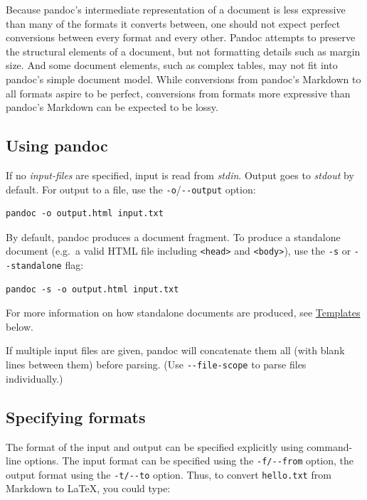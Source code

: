 \documentclass[
]{article}
\begin{document}
Because pandoc's intermediate representation of a document is less
expressive than many of the formats it converts between, one should not
expect perfect conversions between every format and every other. Pandoc
attempts to preserve the structural elements of a document, but not
formatting details such as margin size. And some document elements, such
as complex tables, may not fit into pandoc's simple document model.
While conversions from pandoc's Markdown to all formats aspire to be
perfect, conversions from formats more expressive than pandoc's Markdown
can be expected to be lossy.

\hypertarget{using-pandoc}{%
\subsection{Using pandoc}\label{using-pandoc}}

If no \emph{input-files} are specified, input is read from \emph{stdin}.
Output goes to \emph{stdout} by default. For output to a file, use the
\texttt{-o}/\texttt{-\/-output} option:

\begin{verbatim}
pandoc -o output.html input.txt
\end{verbatim}

By default, pandoc produces a document fragment. To produce a standalone
document (e.g.~a valid HTML file including
\texttt{\textless{}head\textgreater{}} and
\texttt{\textless{}body\textgreater{}}), use the \texttt{-s} or
\texttt{-\/-standalone} flag:

\begin{verbatim}
pandoc -s -o output.html input.txt
\end{verbatim}

For more information on how standalone documents are produced, see
\protect\hyperlink{templates}{Templates} below.

If multiple input files are given, pandoc will concatenate them all
(with blank lines between them) before parsing. (Use
\texttt{-\/-file-scope} to parse files individually.)

\hypertarget{specifying-formats}{%
\subsection{Specifying formats}\label{specifying-formats}}

The format of the input and output can be specified explicitly using
command-line options. The input format can be specified using the
\texttt{-f/-\/-from} option, the output format using the
\texttt{-t/-\/-to} option. Thus, to convert \texttt{hello.txt} from
Markdown to LaTeX, you could type:
\end{document}
